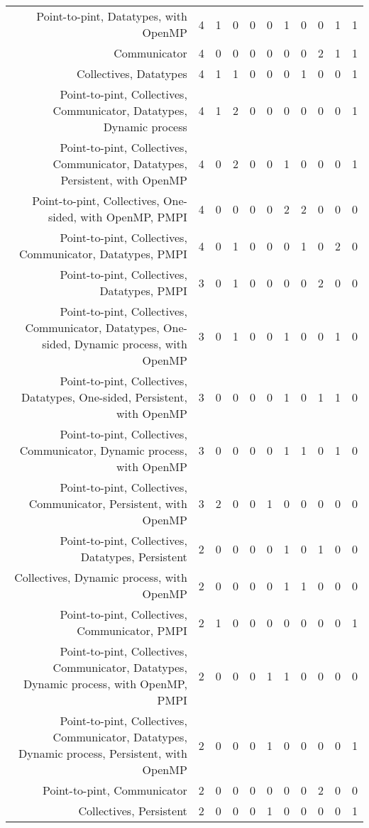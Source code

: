 {\begin{landscape}
\begin{longtable}[htb]{r|c|c|c|c|c|c|c|c|c|c}
{Point-to-pint, Datatypes, with OpenMP} & 4 & 1 & 0 & 0 & 0 & 1 & 0 & 0 & 1 & 1 \\%
{Communicator} & 4 & 0 & 0 & 0 & 0 & 0 & 0 & 2 & 1 & 1 \\%
{Collectives, Datatypes} & 4 & 1 & 1 & 0 & 0 & 0 & 1 & 0 & 0 & 1 \\%
{Point-to-pint, Collectives, Communicator, Datatypes, Dynamic process} & 4 & 1 & 2 & 0 & 0 & 0 & 0 & 0 & 0 & 1 \\%
{Point-to-pint, Collectives, Communicator, Datatypes, Persistent, with OpenMP} & 4 & 0 & 2 & 0 & 0 & 1 & 0 & 0 & 0 & 1 \\%
{Point-to-pint, Collectives, One-sided, with OpenMP, PMPI} & 4 & 0 & 0 & 0 & 0 & 2 & 2 & 0 & 0 & 0 \\%
{Point-to-pint, Collectives, Communicator, Datatypes, PMPI} & 4 & 0 & 1 & 0 & 0 & 0 & 1 & 0 & 2 & 0 \\%
{Point-to-pint, Collectives, Datatypes, PMPI} & 3 & 0 & 1 & 0 & 0 & 0 & 0 & 2 & 0 & 0 \\%
{Point-to-pint, Collectives, Communicator, Datatypes, One-sided, Dynamic process, with OpenMP} & 3 & 0 & 1 & 0 & 0 & 1 & 0 & 0 & 1 & 0 \\%
{Point-to-pint, Collectives, Datatypes, One-sided, Persistent, with OpenMP} & 3 & 0 & 0 & 0 & 0 & 1 & 0 & 1 & 1 & 0 \\%
{Point-to-pint, Collectives, Communicator, Dynamic process, with OpenMP} & 3 & 0 & 0 & 0 & 0 & 1 & 1 & 0 & 1 & 0 \\%
{Point-to-pint, Collectives, Communicator, Persistent, with OpenMP} & 3 & 2 & 0 & 0 & 1 & 0 & 0 & 0 & 0 & 0 \\%
{Point-to-pint, Collectives, Datatypes, Persistent} & 2 & 0 & 0 & 0 & 0 & 1 & 0 & 1 & 0 & 0 \\%
{Collectives, Dynamic process, with OpenMP} & 2 & 0 & 0 & 0 & 0 & 1 & 1 & 0 & 0 & 0 \\%
{Point-to-pint, Collectives, Communicator, PMPI} & 2 & 1 & 0 & 0 & 0 & 0 & 0 & 0 & 0 & 1 \\%
{Point-to-pint, Collectives, Communicator, Datatypes, Dynamic process, with OpenMP, PMPI} & 2 & 0 & 0 & 0 & 1 & 1 & 0 & 0 & 0 & 0 \\%
{Point-to-pint, Collectives, Communicator, Datatypes, Dynamic process, Persistent, with OpenMP} & 2 & 0 & 0 & 0 & 1 & 0 & 0 & 0 & 0 & 1 \\%
{Point-to-pint, Communicator} & 2 & 0 & 0 & 0 & 0 & 0 & 0 & 2 & 0 & 0 \\%
{Collectives, Persistent} & 2 & 0 & 0 & 0 & 1 & 0 & 0 & 0 & 0 & 1 \\%

\end{longtable}
\end{landscape}}
